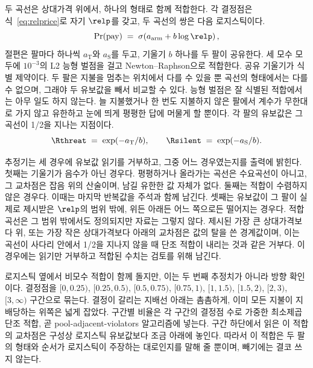 두 곡선은 상대가격 위에서, 하나의 형태로 함께 적합한다. 각 결정점은 식~\eqref{eq:relprice}로 자기 $\relp$를 갖고, 두 곡선의 쌍은 다음 로지스틱이다.
\begin{equation}\label{eq:logistic}
\Pr(\text{pay}) \;=\; \sigma\!\left(a_{\mathrm{arm}} + b \log \relp\right),
\end{equation}
절편은 팔마다 하나씩 $a_{\mathrm{T}}$와 $a_{\mathrm{S}}$를 두고, 기울기 $b$ 하나를 두 팔이 공유한다. 세 모수 모두에 $10^{-3}$의 L2 능형 벌점을 걸고 Newton--Raphson으로 적합한다. 공유 기울기가 식별 제약이다. 두 팔은 지불을 멈추는 위치에서 다를 수 있을 뿐 곡선의 형태에서는 다를 수 없으며, 그래야 두 유보값을 빼서 비교할 수 있다. 능형 벌점은 잘 식별된 적합에서는 아무 일도 하지 않는다. 늘 지불했거나 한 번도 지불하지 않은 팔에서 계수가 무한대로 가지 않고 유한하고 눈에 띄게 평평한 답에 머물게 할 뿐이다. 각 팔의 유보값은 그 곡선이 1/2을 지나는 지점이다.
\begin{equation}\label{eq:rhostar}
\Rthreat \;=\; \exp(-a_{\mathrm{T}} / b), \qquad \Rsilent \;=\; \exp(-a_{\mathrm{S}} / b).
\end{equation}

추정기는 세 경우에 유보값 읽기를 거부하고, 그중 어느 경우였는지를 출력에 밝힌다. 첫째는 기울기가 음수가 아닌 경우다. 평평하거나 올라가는 곡선은 수요곡선이 아니고, 그 교차점은 잡음 위의 산술이며, 남길 유한한 값 자체가 없다. 둘째는 적합이 수렴하지 않은 경우다. 이때는 마지막 반복값을 주석과 함께 남긴다. 셋째는 유보값이 그 팔이 실제로 제시받은 $\relp$의 범위 밖에, 위든 아래든 어느 쪽으로든 떨어지는 경우다. 적합 곡선은 그 범위 밖에서도 정의되지만 자료는 그렇지 않다. 제시된 가장 큰 상대가격보다 위, 또는 가장 작은 상대가격보다 아래의 교차점은 값의 탈을 쓴 경계값이며, 이는 곡선이 사다리 안에서 1/2을 지나지 않을 때 단조 적합이 내리는 것과 같은 거부다. 이 경우에는 읽기만 거부하고 적합된 수치는 검토를 위해 남긴다.

로지스틱 옆에서 비모수 적합이 함께 돌지만, 이는 두 번째 추정치가 아니라 방향 확인이다. 결정점을 $[0, 0.25)$, $[0.25, 0.5)$, $[0.5, 0.75)$, $[0.75, 1)$, $[1, 1.5)$, $[1.5, 2)$, $[2, 3)$, $[3, \infty)$ 구간으로 묶는다. 결정이 갈리는 지배선 아래는 촘촘하게, 이미 모든 지불이 지배당하는 위쪽은 넓게 잡았다. 구간별 비율은 각 구간의 결정점 수로 가중한 최소제곱 단조 적합, 곧 pool-adjacent-violators 알고리즘에 넣는다. 구간 하단에서 읽은 이 적합의 교차점은 구성상 로지스틱 유보값보다 조금 아래에 놓인다. 따라서 이 적합은 두 팔의 형태와 순서가 로지스틱이 주장하는 대로인지를 말해 줄 뿐이며, 빼기에는 결코 쓰지 않는다.

